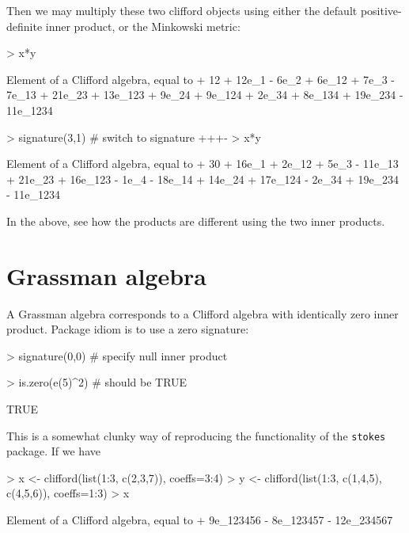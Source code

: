 \documentclass{article}
\begin{document}
Then we may multiply these two clifford objects using either the
default positive-definite inner product, or the Minkowski metric:

\begin{Schunk}
\begin{Sinput}
> x*y
\end{Sinput}
\begin{Soutput}
Element of a Clifford algebra, equal to
+ 12 + 12e_1 - 6e_2 + 6e_12 + 7e_3 - 7e_13 + 21e_23 + 13e_123 + 9e_24 + 9e_124
+ 2e_34 + 8e_134 + 19e_234 - 11e_1234
\end{Soutput}
\begin{Sinput}
> signature(3,1)  # switch to signature +++-
> x*y
\end{Sinput}
\begin{Soutput}
Element of a Clifford algebra, equal to
+ 30 + 16e_1 + 2e_12 + 5e_3 - 11e_13 + 21e_23 + 16e_123 - 1e_4 - 18e_14 +
14e_24 + 17e_124 - 2e_34 + 19e_234 - 11e_1234
\end{Soutput}
\end{Schunk}

In the above, see how the products are different using the two inner
products.  

\section{Grassman algebra}

A Grassman algebra corresponds to a Clifford algebra with identically
zero inner product.  Package idiom is to use a zero signature:

\begin{Schunk}
\begin{Sinput}
> signature(0,0)  # specify null inner product
\end{Sinput}
\end{Schunk}
\begin{Schunk}
\begin{Sinput}
> is.zero(e(5)^2)     # should be TRUE
\end{Sinput}
\begin{Soutput}
[1] TRUE
\end{Soutput}
\end{Schunk}

This is a somewhat clunky way of reproducing the functionality of the
{\tt stokes} package.  If we have

\begin{Schunk}
\begin{Sinput}
> x <- clifford(list(1:3, c(2,3,7)), coeffs=3:4)
> y <- clifford(list(1:3, c(1,4,5), c(4,5,6)), coeffs=1:3)
> x %
\end{Sinput}
\begin{Soutput}
Element of a Clifford algebra, equal to
+ 9e_123456 - 8e_123457 - 12e_234567
\end{Soutput}
\end{Schunk}
\end{document}
